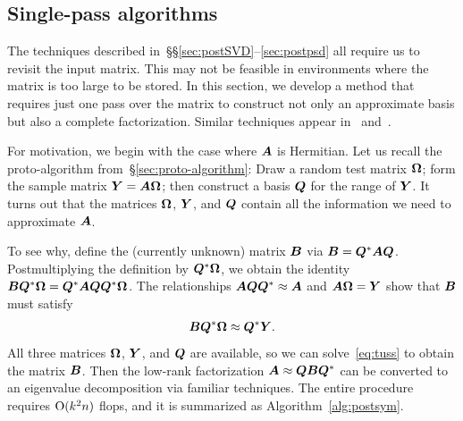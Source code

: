 \documentclass[final]{siamltex}
\newcounter{algorithm}[section]
\begin{document}
\subsection{Single-pass algorithms}
\label{sec:onepass}

The techniques described in~\S\S\ref{sec:postSVD}--\ref{sec:postpsd}
all require us to revisit the input matrix.  This may not be
feasible in environments where the matrix is too large to be
stored.  In this section, we develop a method that requires just
one pass over the matrix to construct not only an approximate
basis but also a complete factorization.  Similar techniques
appear in~\cite{random2} and~\cite{2009_clarkson_woodruff}.

For motivation, we begin with the case where $\bm{A}$ is Hermitian.
Let us recall the proto-algorithm from~\S\ref{sec:proto-algorithm}:
Draw a random test matrix $\bm{\Omega}$; form the sample matrix
$\bm{Y} = \bm{A\Omega}$; then construct a basis $\bm{Q}$ for the
range of $\bm{Y}$.  It turns out that the matrices $\bm{\Omega}$, $\bm{Y}$,
and $\bm{Q}$ contain all the information we need to approximate
$\bm{A}$.

To see why, define the (currently unknown) matrix $\bm{B}$
via $\bm{B} = \bm{Q}^* \bm{AQ}$.
Postmultiplying the definition by $\bm{Q}^* \bm{\Omega}$, we obtain the identity
$\bm{BQ}^* \bm{\Omega} = \bm{Q}^* \bm{AQQ}^* \bm{\Omega}$.
The relationships $\bm{AQQ}^* \approx \bm{A}$ and $\bm{A\Omega} = \bm{Y}$
show that $\bm{B}$ must satisfy
\begin{equation}
\label{eq:tuss}
\mtx{BQ}^{\adj}\mtx{\Omega} \approx \mtx{Q}^{\adj}\mtx{Y}.
\end{equation}
All three matrices $\bm{\Omega}$, $\bm{Y}$, and $\bm{Q}$
are available, so we can solve~\eqref{eq:tuss} to obtain the matrix $\bm{B}$.
Then the low-rank factorization $\bm{A} \approx \bm{QBQ}^*$ can
be converted to an eigenvalue decomposition via familiar techniques.
The entire procedure requires $\mathrm{O}(k^2 n)$ flops, and it is summarized
as Algorithm~\ref{alg:postsym}.

\lsp
\end{document}
